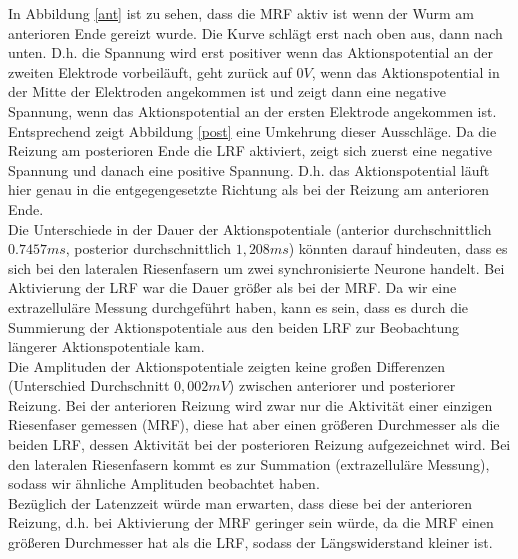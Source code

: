 \documentclass[11pt]{article}
\begin{document}
In Abbildung \ref{ant} ist zu sehen, dass die MRF aktiv ist wenn der Wurm am anterioren Ende gereizt wurde. Die Kurve schlägt erst nach oben aus, dann nach unten. D.h. die Spannung wird erst positiver wenn das Aktionspotential an der zweiten Elektrode vorbeiläuft, geht zurück auf $0V$, wenn das Aktionspotential in der Mitte der Elektroden angekommen ist und zeigt dann eine negative Spannung, wenn das Aktionspotential an der ersten Elektrode angekommen ist. \\
Entsprechend zeigt Abbildung \ref{post} eine Umkehrung dieser Ausschläge. Da die Reizung am posterioren Ende die LRF aktiviert, zeigt sich zuerst eine negative Spannung und danach eine positive Spannung. D.h. das Aktionspotential läuft hier genau in die entgegengesetzte Richtung als bei der Reizung am anterioren Ende. \\
Die Unterschiede in der Dauer der Aktionspotentiale (anterior durchschnittlich $0.7457ms$, posterior durchschnittlich $1,208ms$) könnten darauf hindeuten, dass es sich bei den lateralen Riesenfasern um zwei \glqq synchronisierte\grqq{} Neurone handelt. Bei Aktivierung der LRF war die Dauer größer als bei der MRF. Da wir eine extrazelluläre Messung durchgeführt haben, kann es sein, dass es durch die Summierung der Aktionspotentiale aus den beiden LRF zur Beobachtung längerer Aktionspotentiale kam. \\
Die Amplituden der Aktionspotentiale zeigten keine großen Differenzen (Unterschied Durchschnitt $0,002mV$) zwischen anteriorer und posteriorer Reizung. Bei der anterioren Reizung wird zwar nur die Aktivität einer einzigen Riesenfaser gemessen (MRF), diese hat aber einen größeren Durchmesser als die beiden LRF, dessen Aktivität bei der posterioren Reizung aufgezeichnet wird. Bei den lateralen Riesenfasern kommt es zur Summation (extrazelluläre Messung), sodass wir ähnliche Amplituden beobachtet haben. \\
Bezüglich der Latenzzeit würde man erwarten, dass diese bei der anterioren Reizung, d.h. bei Aktivierung der MRF geringer sein würde, da die MRF einen größeren Durchmesser hat als die LRF, sodass der Längswiderstand kleiner ist. \\

\end{document}
